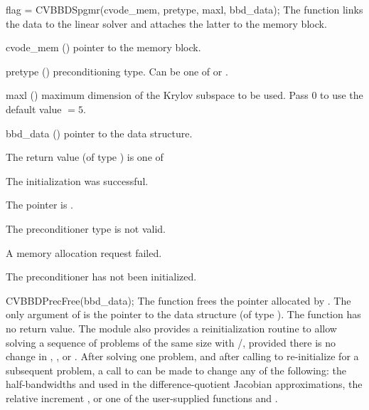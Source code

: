 {
  flag = CVBBDSpgmr(cvode\_mem, pretype, maxl, bbd\_data);
}
{
  The function  links the {\cvbbdpre} data to the
  {\cvspgmr} linear solver and attaches the latter to the {\cvode}
  memory block.
}
{
  \begin{args}
  \item[cvode\_mem] ()
    pointer to the {\cvode} memory block.
  \item[pretype] ()
    preconditioning type. Can be one of  or .
  \item[maxl] ()
    maximum dimension of the Krylov subspace to be used. Pass $0$ to use the 
    default value $=5$.
  \item[bbd\_data] ()
    pointer to the {\cvbbdpre} data structure.
  \end{args}
}
{
  The return value  (of type ) is one of
  \begin{args}
  \item[\Id{SUCCESS}] 
    The {\cvspgmr} initialization was successful.
  \item[\Id{LIN\_NO\_MEM}]
    The  pointer is .
  \item[\Id{LIN\_ILL\_INPUT}]
    The preconditioner type  is not valid.
  \item[\Id{LMEM\_FAIL}]
    A memory allocation request failed.
  \item[\Id{BBDP\_NO\_DATA}]
    The {\cvbbdpre} preconditioner has not been initialized.
  \end{args}
}
{}
{
  CVBBDPrecFree(bbd\_data);
}
{
  The function  frees the pointer allocated by
  .
}
{
  The only argument of  is the pointer to the {\cvbbdpre} 
  data structure (of type ).
}
{
  The function  has no return value.
}
{}
The {\cvbbdpre} module also provides a reinitialization routine to allow
solving  a sequence of problems of the same size with {\cvspgmr}/{\cvbbdpre},
provided there is no change in , , or .
After solving one problem, and after calling  to re-initialize 
{\cvode} for a subsequent problem, a call to  can be made
to change any of the following: the half-bandwidths  and  
used in the difference-quotient Jacobian approximations, the relative increment , 
or one of the user-supplied functions  and .
